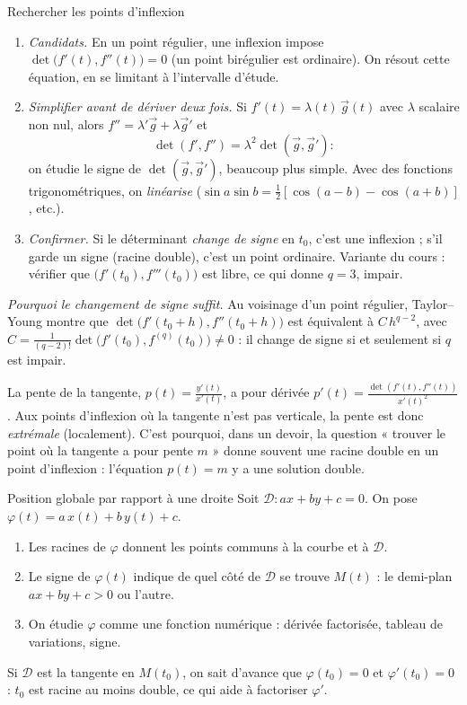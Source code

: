 \documentclass[a4paper,11pt]{article}
\numberwithin{equation}{section}
\numberwithin{figure}{section}
\numberwithin{table}{section}
\theoremstyle{enonce}
\theoremstyle{exemple}
\theoremstyle{remarque}
\newcommand{\ve}[1]{\vec{#1}}
\begin{document}
\begin{methode}{Rechercher les points d'inflexion}\label{meth:inflexion}
\begin{enumerate}
\item \emph{Candidats.} En un point régulier, une inflexion impose $\det\big(f'(t),f''(t)\big)=0$ (un point birégulier
      est ordinaire). On résout cette équation, en se limitant à l'intervalle d'étude.
\item \emph{Simplifier avant de dériver deux fois.} Si $f'(t)=\lambda(t)\,\ve g(t)$ avec $\lambda$ scalaire non nul, alors
      $f''=\lambda'\ve g+\lambda\ve g'$ et
      \[\det(f',f'')=\lambda^2\det(\ve g,\ve g') :\]
      on étudie le signe de $\det(\ve g,\ve g')$, beaucoup plus simple. Avec des fonctions trigonométriques, on
      \emph{linéarise} ($\sin a\sin b=\frac12[\cos(a-b)-\cos(a+b)]$, etc.).
\item \emph{Confirmer.} Si le déterminant \emph{change de signe} en $t_0$, c'est une inflexion ; s'il garde un signe
      (racine double), c'est un point ordinaire. Variante du cours : vérifier que $\big(f'(t_0),f'''(t_0)\big)$ est libre,
      ce qui donne $q=3$, impair.
\end{enumerate}
\end{methode}

\emph{Pourquoi le changement de signe suffit.} Au voisinage d'un point régulier, Taylor--Young montre que
$\det\big(f'(t_0+h),f''(t_0+h)\big)$ est équivalent à $C\,h^{q-2}$, avec
$C=\frac{1}{(q-2)!}\det\big(f'(t_0),f^{(q)}(t_0)\big)\neq0$ : il change de signe si et seulement si $q$ est impair.

\begin{astuce}
La pente de la tangente, $p(t)=\frac{y'(t)}{x'(t)}$, a pour dérivée $p'(t)=\frac{\det(f'(t),f''(t))}{x'(t)^2}$. Aux points
d'inflexion où la tangente n'est pas verticale, la pente est donc \emph{extrémale} (localement). C'est pourquoi, dans un
devoir, la question « trouver le point où la tangente a pour pente $m$ » donne souvent une racine double en un point
d'inflexion : l'équation $p(t)=m$ y a une solution double.
\end{astuce}

\begin{methode}{Position globale par rapport à une droite}\label{meth:posglob}
Soit $\mathcal D:ax+by+c=0$. On pose $\varphi(t)=a\,x(t)+b\,y(t)+c$.
\begin{enumerate}
\item Les racines de $\varphi$ donnent les points communs à la courbe et à $\mathcal D$.
\item Le signe de $\varphi(t)$ indique de quel côté de $\mathcal D$ se trouve $M(t)$ : le demi-plan $ax+by+c>0$ ou
      l'autre.
\item On étudie $\varphi$ comme une fonction numérique : dérivée factorisée, tableau de variations, signe.
\end{enumerate}
Si $\mathcal D$ est la tangente en $M(t_0)$, on sait d'avance que $\varphi(t_0)=0$ et $\varphi'(t_0)=0$ : $t_0$ est racine
au moins double, ce qui aide à factoriser $\varphi'$.
\end{methode}
\end{document}
